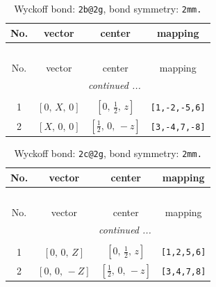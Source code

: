 \documentclass[fleqn,8pt]{jsarticle}
\begin{document}
\renewcommand{\arraystretch}{1.2}
\begin{longtable}{cccc}
\caption{Wyckoff bond: {\tt 2b@2g}, bond symmetry: {\tt 2mm.}}
 \\
 \hline \hline
No. & vector & center & mapping \\ \hline \endfirsthead

\multicolumn{3}{l}{\tablename\ \thetable{}} \\
 \hline \hline
No. & vector & center & mapping \\ \hline \endhead

 \hline \hline
\multicolumn{3}{r}{\footnotesize\it continued ...} \\ \endfoot

 \hline \hline
\multicolumn{3}{r}{} \\ \endlastfoot

1 & $\left[ 0,\, X,\, 0 \right]$ & $\left[ 0,\, \frac{1}{2},\, z \right]$ & {\tt [1,-2,-5,6]} \\ \hline
2 & $\left[ X,\, 0,\, 0 \right]$ & $\left[ \frac{1}{2},\, 0,\, - z \right]$ & {\tt [3,-4,7,-8]} \\
\end{longtable}
\renewcommand{\arraystretch}{1.2}
\begin{longtable}{cccc}
\caption{Wyckoff bond: {\tt 2c@2g}, bond symmetry: {\tt 2mm.}}
 \\
 \hline \hline
No. & vector & center & mapping \\ \hline \endfirsthead

\multicolumn{3}{l}{\tablename\ \thetable{}} \\
 \hline \hline
No. & vector & center & mapping \\ \hline \endhead

 \hline \hline
\multicolumn{3}{r}{\footnotesize\it continued ...} \\ \endfoot

 \hline \hline
\multicolumn{3}{r}{} \\ \endlastfoot

1 & $\left[ 0,\, 0,\, Z \right]$ & $\left[ 0,\, \frac{1}{2},\, z \right]$ & {\tt [1,2,5,6]} \\ \hline
2 & $\left[ 0,\, 0,\, - Z \right]$ & $\left[ \frac{1}{2},\, 0,\, - z \right]$ & {\tt [3,4,7,8]} \\
\end{longtable}
\renewcommand{\arraystretch}{1.2}
\end{document}
